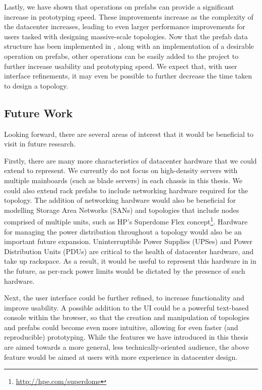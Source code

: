 \documentclass[11pt]{article}
\begin{document}
		Lastly, we have shown that operations on prefabs can provide a significant increase in prototyping speed.
		These improvements increase as the complexity of the datacenter increases, leading to even larger performance improvements for users tasked with designing massive-scale topologies.
		Now that the prefab data structure has been implemented in \opendc{}, along with an implementation of a desirable operation on prefabs, other operations can be easily added to the project to further increase usability and prototyping speed.
		We expect that, with user interface refinements, it may even be possible to further decrease the time taken to design a topology.


	\subsection{Future Work} \label{sec:future-work}
		Looking forward, there are several areas of interest that it would be beneficial to visit in future research.

		Firstly, there are many more characteristics of datacenter hardware that we could extend \opendc{} to represent. 
		We currently do not focus on high-density servers with multiple mainboards (such as blade servers) in each chassis in this thesis. 
		We could also extend rack prefabs to include networking hardware required for the topology. 
		The addition of networking hardware would also be beneficial for modelling Storage Area Networks (SANs) and topologies that include nodes comprised of multiple units, such as HP's Superdome Flex concept\footnote{\url{http://hpe.com/superdome}}.
		Hardware for managing the power distribution throughout a topology would also be an important future expansion.
		Uninterruptible Power Supplies (UPSes) and Power Distribution Units (PDUs) are critical to the health of datacenter hardware, and take up rackspace.
		As a result, it would be useful to represent this hardware in \opendc{} in the future, as per-rack power limits would be dictated by the presence of such hardware.

		Next, the \opendc{} user interface could be further refined, to increase functionality and improve usability.
		A possible addition to the UI could be a powerful text-based console within the browser, so that the creation and manipulation of topologies and prefabs could become even more intuitive, allowing for even faster (and reproducible) prototyping.
		While the features we have introduced in this thesis are aimed towards a more general, less technically-oriented audience, the above feature would be aimed at users with more experience in datacenter design.
\end{document}

